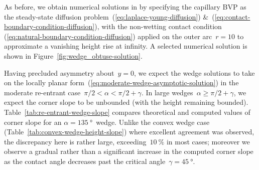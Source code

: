 \begin{figure}
  \begin{minipage}[t]{0.48\textwidth}
  \end{minipage}
  \hfill
  \begin{minipage}[t]{0.48\textwidth}
  \end{minipage}
\end{figure}

As before, we obtain numerical solutions in 
by specifying the capillary BVP
as the steady-state diffusion problem~(\ref{eq:laplace-young-diffusion})
\&~(\ref{eq:contact-boundary-condition-diffusion}),
with the non-wetting contact condition~%
  (\ref{eq:natural-boundary-condition-diffusion})
applied on the outer arc~$r = 10$
to approximate a vanishing height rise at infinity.
A selected numerical solution is shown
in Figure~\ref{fig:wedge_obtuse-solution}.

\begin{figure}
\end{figure}

Having precluded asymmetry about~$y = 0$,
we expect the wedge solutions to take on
the locally planar form~(\ref{eq:moderate-wedge-asymptotic-solution})
in the moderate re-entrant case~$\pi/2 < \alpha < \pi/2 + \gamma$.
In large wedges~$\alpha \ge \pi/2 + \gamma$,
we expect the corner slope to be unbounded
(with the height remaining bounded).
Table~\ref{tab:re-entrant-wedge-slope}
compares theoretical and computed values of corner slope
for an $\alpha = \SI{135}{\degree}$~wedge.
Unlike the convex wedge case (Table~\ref{tab:convex-wedge-height-slope})
where excellent agreement was observed,
the discrepancy here is rather large,
exceeding~$\SI{10}{\percent}$ in most cases;
moreover we observe a gradual rather than a significant increase
in the computed corner slope
as the contact angle decreases past
the critical angle~$\gamma = \SI{45}{\degree}$.

